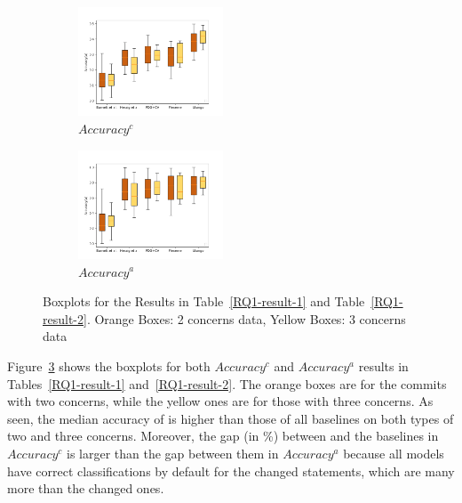 \begin{figure}
	\centering
	\begin{subfigure}{0.235\textwidth}
		\centering
		\includegraphics[width=1.7in]{figures/RQ_1_1.png}
                \vspace{-16pt}
		\caption{$Accuracy^c$}
		\label{RQ1-result-3-1}
	\end{subfigure}
	\begin{subfigure}{0.235\textwidth}
		\centering
		\includegraphics[width=1.7in]{figures/RQ_1_2.png}
                \vspace{-16pt}
		\caption{$Accuracy^a$}
		\label{RQ1-result-3-2}
	\end{subfigure}
        \vspace{-12pt}
	\caption{Boxplots for the Results in Table~\ref{RQ1-result-1} and Table~\ref{RQ1-result-2}. Orange Boxes: 2 concerns data, Yellow Boxes: 3 concerns data}
	\label{RQ1-result-3}
\end{figure}

Figure~\ref{RQ1-result-3} shows the boxplots for both $Accuracy^c$ and
$Accuracy^a$ results in Tables~\ref{RQ1-result-1}
and~\ref{RQ1-result-2}. The orange boxes are for the commits with two
concerns, while the yellow ones are for those with three concerns. As
seen, the median accuracy of {\tool} is higher than those of all
baselines on both types of two and three concerns. Moreover, the gap
(in \%) between {\tool} and the baselines in $Accuracy^{c}$ is larger
than the gap between them in $Accuracy^{a}$ because all models have
correct classifications by default for the changed statements, which
are many more than the changed ones.


